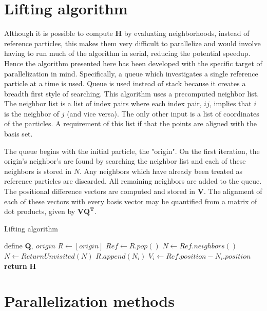 \documentclass{article}
\begin{document}
\section{Lifting algorithm}
Although it is possible to compute $\mathbf{H}$ by evaluating neighborhoods, instead of reference particles, this makes them very difficult to parallelize and would involve having to run much of the algorithm in serial, reducing the potential speedup. Hence the algorithm presented here has been developed with the specific target of parallelization in mind. Specifically, a queue which investigates a single reference particle at a time is used. Queue is used instead of stack because it creates a breadth first style of searching. This algorithm uses a precomputed neighbor list. The neighbor list is a list of index pairs where each index pair, $ij$, implies that $i$ is the neighbor of $j$ (and vice versa). The only other input is a list of coordinates of the particles. A requirement of this list if that the points are aligned with the basis set. 

The queue begins with the initial particle, the "origin". On the first iteration, the origin's neighbor's are found by searching the neighbor list and each of these neighbors is stored in $N$. Any neighbors which have already been treated as reference particles are discarded. All remaining neighbors are added to the queue. The positional difference vectors are computed and stored in $\mathbf{V}$. The alignment of each of these vectors with every basis vector may be quantified from a matrix of dot products, given by $\mathbf{V}\mathbf{Q^{T}}$. 
\begin{algorithm}[htp!]
    \caption{Lifting algorithm}\label{alg:Lifting}
    \begin{algorithmic}[1]
    \State define $\mathbf{Q},\ origin$
    \State $R \gets [origin]$
    \State $Ref \gets R.pop()$
    \State $N \gets Ref.neighbors()$
    \State $N \gets ReturnUnvisited(N)$
    \State $R.append(N_i)$ 
    \State $V_i \gets Ref.position - N_i.position$
    \EndFor
    \EndWhile
    \State \textbf{return} $\mathbf{H}$
    \end{algorithmic}
\end{algorithm}

\section{Parallelization methods}
\end{document}

